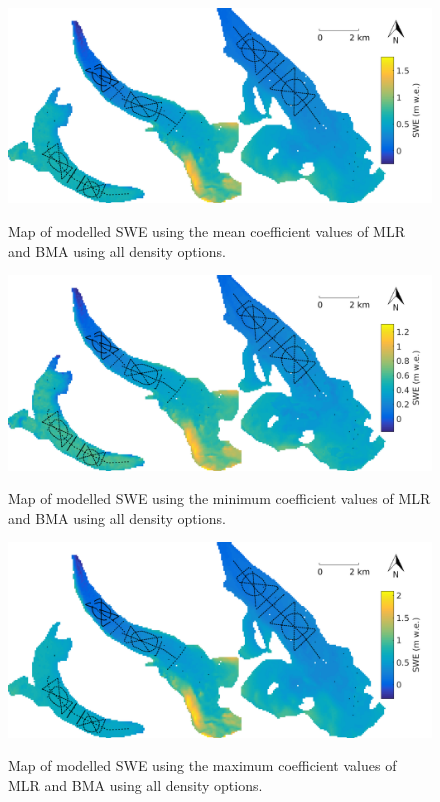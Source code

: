 \documentclass[12pt]{article}
\begin{document}
\begin{figure}[H]
	\centering
	\includegraphics[width =\textwidth]{SWEmeanModelled.png}\\
	\caption{Map of modelled SWE using the mean coefficient values of MLR and BMA using all density options.}
	\label{fig:SWEmeanModelled}
\end{figure}
	
	\begin{figure}[H]
	\centering
	\includegraphics[width =\textwidth]{SWEminModelled.png}\\
	\caption{Map of modelled SWE using the minimum coefficient values of MLR and BMA using all density options.}
	\label{fig:SWEminModelled}
\end{figure}
	
	\begin{figure}[H]
	\centering
	\includegraphics[width =\textwidth]{SWEmaxModelled.png}\\
	\caption{Map of modelled SWE using the maximum coefficient values of MLR and BMA using all density options.}
	\label{fig:SWEmaxModelled}
\end{figure}
	
\end{document}
